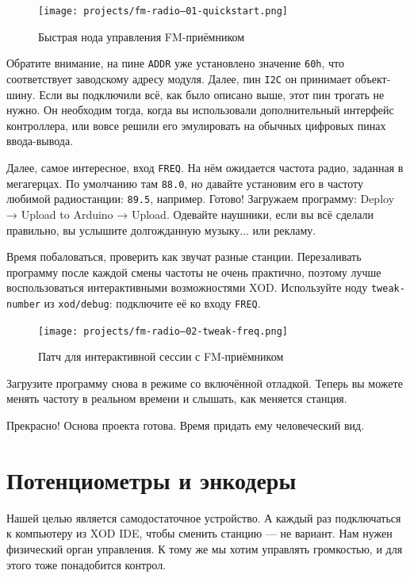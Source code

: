 \begin{figure}
  \centering
  \texttt{[image: projects/fm-radio--01-quickstart.png]}
  \caption{Быстрая нода управления FM-приёмником}
\end{figure}

Обратите внимание, на пине \texttt{ADDR} уже установлено значение \texttt{60h}, что соответствует заводскому адресу модуля. Далее, пин \texttt{I2C} он принимает объект-шину. Если вы подключили всё, как было описано выше, этот пин трогать не нужно. Он необходим тогда, когда вы использовали дополнительный интерфейс контроллера, или вовсе решили его эмулировать на обычных цифровых пинах ввода-вывода.


Далее, самое интересное, вход \texttt{FREQ}. На нём ожидается частота радио, заданная в мегагерцах. По умолчанию там \texttt{88.0}, но давайте установим его в частоту любимой радиостанции: \texttt{89.5}, например.  Готово! Загружаем программу: Deploy → Upload to Arduino → Upload. Одевайте наушники, если вы всё сделали правильно, вы услышите долгожданную музыку... или рекламу.

Время побаловаться, проверить как звучат разные станции. Перезаливать программу после каждой смены частоты не очень практично, поэтому лучше воспользоваться интерактивными возможностями XOD. Используйте ноду \texttt{tweak-number} из \texttt{xod/debug}: подключите её ко входу \texttt{FREQ}.

\begin{figure}
  \centering
  \texttt{[image: projects/fm-radio--02-tweak-freq.png]}
  \caption{Патч для интерактивной сессии с FM-приёмником}
\end{figure}

Загрузите программу снова в режиме со включённой отладкой. Теперь вы можете менять частоту в реальном времени и слышать, как меняется станция.

Прекрасно! Основа проекта готова. Время придать ему человеческий вид.

\section{Потенциометры и энкодеры}

Нашей целью является самодостаточное устройство. А каждый раз подключаться к компьютеру из XOD IDE, чтобы сменить станцию — не вариант. Нам нужен физический орган управления. К тому же мы хотим управлять громкостью, и для этого тоже понадобится контрол.

